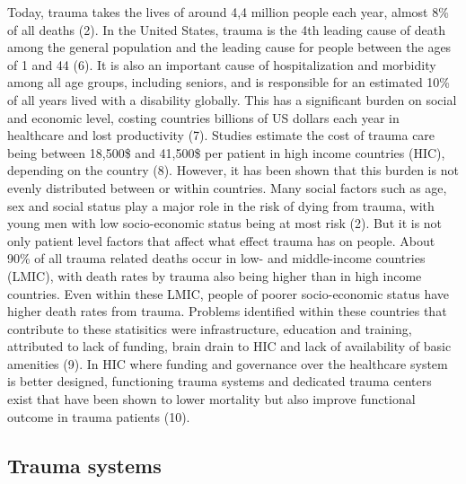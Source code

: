 \documentclass[
]{article}
\begin{document}
Today, trauma takes the lives of around 4,4 million people each year,
almost 8\% of all deaths (2). In the United States, trauma is the 4th
leading cause of death among the general population and the leading
cause for people between the ages of 1 and 44 (6). It is also an
important cause of hospitalization and morbidity among all age groups,
including seniors, and is responsible for an estimated 10\% of all years
lived with a disability globally. This has a significant burden on
social and economic level, costing countries billions of US dollars each
year in healthcare and lost productivity (7). Studies estimate the cost
of trauma care being between 18,500\$ and 41,500\$ per patient in high
income countries (HIC), depending on the country (8). However, it has
been shown that this burden is not evenly distributed between or within
countries. Many social factors such as age, sex and social status play a
major role in the risk of dying from trauma, with young men with low
socio-economic status being at most risk (2). But it is not only patient
level factors that affect what effect trauma has on people. About 90\%
of all trauma related deaths occur in low- and middle-income countries
(LMIC), with death rates by trauma also being higher than in high income
countries. Even within these LMIC, people of poorer socio-economic
status have higher death rates from trauma. Problems identified within
these countries that contribute to these statisitics were
infrastructure, education and training, attributed to lack of funding,
brain drain to HIC and lack of availability of basic amenities (9). In
HIC where funding and governance over the healthcare system is better
designed, functioning trauma systems and dedicated trauma centers exist
that have been shown to lower mortality but also improve functional
outcome in trauma patients (10).

\hypertarget{trauma-systems}{%
\subsection{Trauma systems}\label{trauma-systems}}
\end{document}
